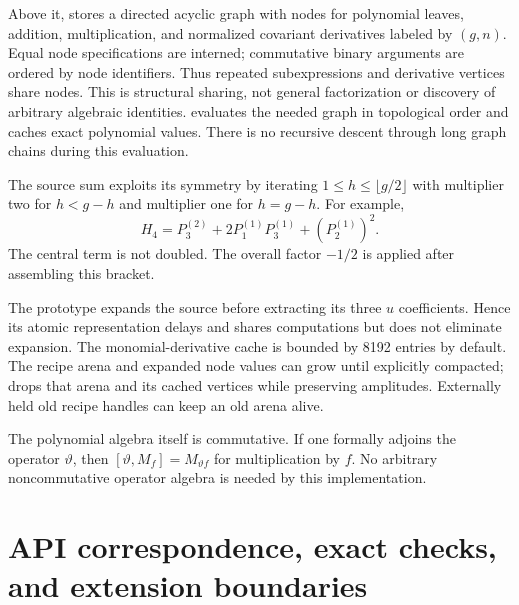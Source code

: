 \documentclass[11pt,a4paper]{article}
\numberwithin{equation}{section}
\newcommand{\tht}{\vartheta}
\newcommand{\Pg}[2]{P_{#1}^{(#2)}}
\newcommand{\code}[1]{\texttt{\detokenize{#1}}}
\begin{document}
Above it, \code{RecipeArena} stores a directed acyclic graph with nodes
for polynomial leaves, addition, multiplication, and normalized covariant
derivatives labeled by $(g,n)$. Equal node specifications are interned;
commutative binary arguments are ordered by node identifiers. Thus repeated
subexpressions and derivative vertices share nodes. This is structural sharing,
not general factorization or discovery of arbitrary algebraic identities.
\code{expand()} evaluates the needed graph in topological order and caches
exact polynomial values. There is no recursive descent through long graph
chains during this evaluation.

The source sum exploits its symmetry by iterating
$1\le h\le\lfloor g/2\rfloor$ with multiplier two for $h<g-h$
and multiplier one for $h=g-h$. For example,
\begin{equation}
H_4=\Pg32+2\Pg11\Pg31+(\Pg21)^2.
\end{equation}
The central term is not doubled. The overall factor $-1/2$ is applied
after assembling this bracket.

The prototype expands the source before extracting its three $u$
coefficients. Hence its atomic representation delays and shares computations
but does not eliminate expansion. The monomial-derivative cache is bounded
by 8192 entries by default. The recipe arena and expanded node values can
grow until explicitly compacted; \code{compact_recipes()} drops that arena
and its cached vertices while preserving amplitudes. Externally held old
recipe handles can keep an old arena alive.

The polynomial algebra itself is commutative. If one formally adjoins the
operator $\tht$, then $[\tht,M_f]=M_{\tht f}$ for multiplication by $f$.
No arbitrary noncommutative operator algebra is needed by this implementation.

\section{API correspondence, exact checks, and extension boundaries}
\end{document}
